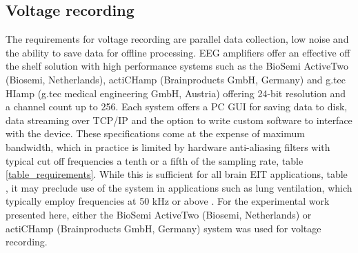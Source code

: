 \subsection{Voltage recording}
The requirements for voltage recording are parallel data collection, low noise and the ability to save data for offline processing. EEG amplifiers offer an effective off the shelf solution with high performance systems such as the BioSemi ActiveTwo (Biosemi, Netherlands), actiCHamp (Brainproducts GmbH, Germany) and g.tec HIamp (g.tec medical engineering GmbH, Austria) offering 24-bit resolution and a channel count up to 256. Each system offers a PC GUI for saving data to disk, data streaming over TCP/IP and the option to write custom software to interface with the device. These specifications come at the expense of maximum bandwidth, which in practice is limited by hardware anti-aliasing filters with typical cut off frequencies a tenth or a fifth of the sampling rate, table \ref{table_requirements}. While this is sufficient for all brain EIT applications, table \label{table_requirements}, it may preclude use of the system in applications such as lung ventilation, which typically employ frequencies at 50 kHz or above \cite{Frerichs_2000}. For the experimental work presented here, either the BioSemi ActiveTwo (Biosemi, Netherlands) or actiCHamp (Brainproducts GmbH, Germany) system was used for voltage recording. 
